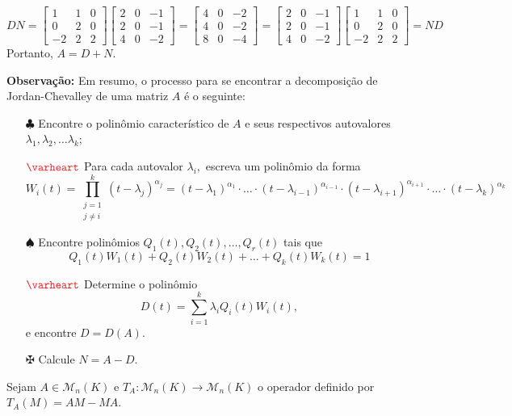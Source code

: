 \documentclass[11pt,a4paper]{article}
\begin{document}
{\[DN =  \begin{bmatrix}
1 & 1 & 0 \\
0 & 2 & 0 \\
-2 & 2 & 2
\end{bmatrix} \begin{bmatrix}
2 & 0 & -1 \\
2 & 0 & -1 \\
4 & 0 & -2\end{bmatrix} = \begin{bmatrix}
4 & 0 & -2 \\
4 & 0 & -2 \\
8 & 0 & -4\end{bmatrix} = \begin{bmatrix}
2 & 0 & -1 \\
2 & 0 & -1 \\
4 & 0 & -2\end{bmatrix} \begin{bmatrix}
1 & 1 & 0 \\
0 & 2 & 0 \\
-2 & 2 & 2
\end{bmatrix} = ND
\]
Portanto, $A = D + N.$

\bigskip
\noindent
\textbf{Observação:} Em resumo, o processo para se encontrar a decomposição de Jordan-Chevalley de uma matriz $A$ é o seguinte:
\begin{itemize}
\item[$\clubsuit$] Encontre o polinômio característico de $A$ e seus respectivos autovalores $\lambda_1, \lambda_2, \ldots \lambda_k;$
\item[$\textcolor{Red}{\varheart}$] Para cada autovalor $\lambda_i,$ escreva um polinômio da forma
\[
W_i(t) = \prod\limits_{\substack{j=1 \\ j \neq i}}^k (t - \lambda_j)^{\alpha_j} = (t - \lambda_1)^{\alpha_1} \cdot \ldots \cdot  (t - \lambda_{i-1})^{\alpha_{i-1}} \cdot  (t - \lambda_{i+1})^{\alpha_{i+1}} \cdot \ldots \cdot  (t - \lambda_k)^{\alpha_k}
\]
\item[$\spadesuit$] Encontre polinômios $Q_1(t), Q_2(t), \ldots, Q_r(t)$ tais que
\[
Q_1(t)W_1(t) + Q_2(t)W_2(t) + \ldots + Q_k(t)W_k(t) = 1
\]
\item[$\textcolor{Red}{\varheart}$] Determine o polinômio
\[
D(t) = \sum\limits_{i = 1}^k \lambda_i Q_i(t)W_i(t),
\]
e encontre $D = D(A).$
\item[$\maltese$] Calcule $N = A - D.$
\end{itemize}
}

 Sejam $A \in \mathcal{M}_n(K)$ e $T_A \colon \mathcal{M}_n(K) \to \mathcal{M}_n(K)$ o operador definido por $T_A(M) = AM - MA.$
\end{document}
